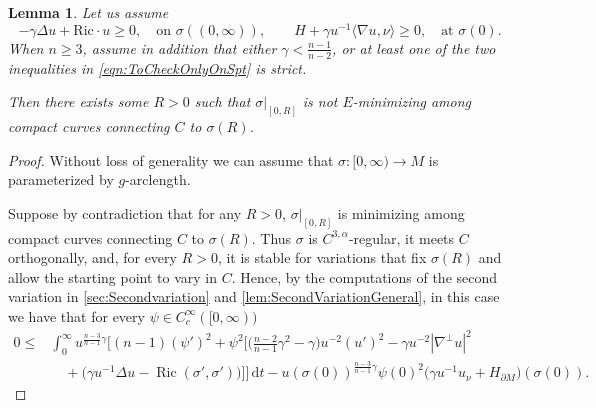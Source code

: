 \documentclass[12pt,a4paper,reqno]{amsart}
\newtheorem{lemma}{Lemma}
\theoremstyle{definition}
\renewcommand{\leq}{\leqslant}
\renewcommand{\geq}{\geqslant}
\DeclareMathOperator{\Ric}{Ric}
\begin{document}
{\begin{lemma}
    Let us assume
        \begin{equation}\label{eqn:ToCheckOnlyOnSpt}
        -\gamma\Delta u+\mathrm{Ric}\cdot u \geq 0, \quad \text{on $\sigma((0,\infty))$}, \qquad H+\gamma u^{-1}\langle \nabla u,\nu\rangle\geq 0, \quad \text{at $\sigma(0)$}.
        \end{equation}
     When $n\geq3$, assume in addition that either
$\gamma<\frac{n-1}{n-2}$, or at least one of the two inequalities in
\eqref{eqn:ToCheckOnlyOnSpt} is strict.
     
     Then there exists some $R>0$ such that $\sigma|_{[0, R]}$ is not $E$-minimizing among compact curves connecting $C$ to $\sigma(R)$.
\end{lemma}
\begin{proof}
    Without loss of generality we can assume that $\sigma:[0,\infty)\to M$ is parameterized by $g$-arclength. 
    
    Suppose by contradiction that for any $R > 0$, $\sigma|_{[0, R]}$ is minimizing among compact curves connecting $C$ to $\sigma (R)$. Thus $\sigma$ is $C^{3,\alpha}$-regular, it meets $C$ orthogonally, and, for every $R>0$, it is stable for variations that fix $\sigma(R)$ and allow the starting point to vary in $C$.  Hence, by the computations of the second variation in \cref{sec:Secondvariation} and \cref{lem:SecondVariationGeneral}, in this case we have that for every $\psi\in C^\infty_c([0,\infty))$
    \begin{equation}\label{eqn:Secondvariationoneboundarycomponent}
    \begin{aligned}
    0\leq &\int_0^\infty u^{\frac{n-3}{n-1}\gamma}\Big[
(n-1)(\psi')^2 
+\psi^2\Big[\Big(\frac{n-2}{n-1}\gamma^2-\gamma\Big)
u^{-2}(u')^2 -\gamma u^{-2}|\nabla^\perp u|^2 \\
&\quad 
+\Big(\gamma u^{-1}\Delta u
-\Ric(\sigma',\sigma')\Big)
\Big]\Big]\,\mathrm{d}t - 
u(\sigma(0))^{\frac{n-3}{n-1}\gamma}\psi(0)^2
\bigl(\gamma u^{-1}u_\nu+H_{\partial M}\bigr)(\sigma(0)).
\end{aligned}
    \end{equation}


\end{proof}}
\end{document}
